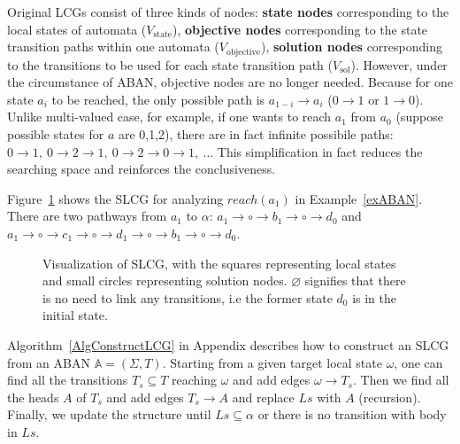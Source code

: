 \begin{remark}
Original LCGs consist of three kinds of nodes: \textbf{state nodes} corresponding to the local states of automata {\rm($V_{\mathrm{state}}$)}, \textbf{objective nodes} corresponding to the state transition paths within one automata {\rm($V_{\mathrm{objective}}$)}, \textbf{solution nodes} corresponding to the transitions to be used for each state transition path {\rm($V_{\mathrm{sol}}$)}.
However, under the circumstance of ABAN, objective nodes are no longer needed.
Because for one state $a_i$ to be reached, the only possible path is $a_{1-i}\to a_i$ ($0\to1 $ or $1\to 0$).
Unlike multi-valued case, for example, if one wants to reach $a_1$ from $a_0$ (suppose possible states for $a$ are 0,1,2), there are in fact infinite possibile paths: $0\to 1,\ 0\to 2 \to 1,\ 0 \to 2 \to 0 \to 1,\ \ldots$
This simplification in fact reduces the searching space and reinforces the conclusiveness.
\end{remark}

\begin{example}
    Figure~\ref{LCGexample} shows the SLCG for analyzing $reach(a_1)$ in Example~\ref{exABAN}.
    There are two pathways from $a_1$ to $\alpha$: $a_1\to \circ\to b_1\to \circ\to d_0$ and $a_1\to \circ\to c_1\to \circ\to d_1\to \circ\to b_1\to \circ \to d_0$.
    \begin{figure}[ht]
        \centering
        
        \caption[Example of SLCG]{Visualization of SLCG, with the squares representing local states and small circles representing solution nodes.
        $\varnothing$ signifies that there is no need to link any transitions, i.e the former state $d_0$ is in the initial state.}
        \label{LCGexample}
    \end{figure}
\end{example}

Algorithm~\ref{AlgConstructLCG} in Appendix describes how to construct an SLCG from an ABAN $\mathbb{A} = (\Sigma,T)$.
Starting from  a given target local state $\omega$, one can find all the transitions $T_s\subseteq T$ reaching $\omega$ and add edges $\omega \to T_s$.
Then we find all the heads $A$ of $T_s$ and add edges $T_s \to A$ and replace $Ls$ with $A$ (recursion).
Finally, we update the structure until $Ls\subseteq \alpha$ or there is no transition with body in $Ls$.

